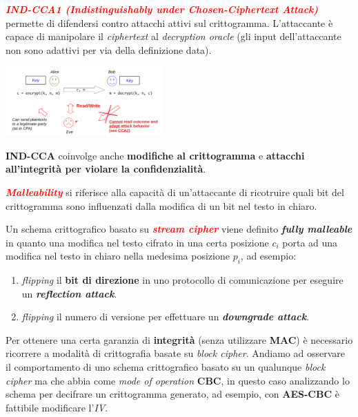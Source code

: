 \begin{flushleft}
    \textcolor{red}{\textbf{\textit{IND-CCA1 (Indistinguishably under Chosen-Ciphertext Attack)}}} permette di difendersi contro attacchi attivi sul crittogramma. L'attaccante è capace di manipolare il \textit{ciphertext} al \textit{decryption oracle} (gli input dell'attaccante non sono adattivi per via della definizione data).

    {\centering
        \includegraphics[width=0.45\textwidth]{img/ind_cca1.png}
    \par}

    \textbf{IND-CCA} coinvolge anche \textbf{modifiche al crittogramma} e \textbf{attacchi all'integrità per violare la confidenzialità}. 

    \smallskip

    \textcolor{red}{\textbf{\textit{Malleability}}} si riferisce alla capacità di un'attaccante di ricotruire quali bit del crittogramma sono influenzati dalla modifica di un bit nel testo in chiaro.

    \smallskip

    Un schema crittografico basato su \textcolor{red}{\textbf{\textit{stream cipher}}} viene definito \textbf{\textit{fully malleable}} in quanto una modifica nel testo cifrato in una certa posizione $c_i$ porta ad una modifica nel testo in chiaro nella medesima posizione $p_i$, ad esempio:
    \begin{enumerate}[nosep]
        \item \textit{flipping} il \textbf{bit di direzione} in uno protocollo di comunicazione per eseguire un \textbf{\textit{reflection attack}}.
        \item \textit{flipping} il numero di versione per effettuare un \textbf{\textit{downgrade attack}}.
    \end{enumerate}

    \smallskip

    Per ottenere una certa garanzia di \textbf{integrità} (senza utilizzare \textbf{MAC}) è necessario ricorrere a modalità di crittografia basate su \textit{block cipher}. Andiamo ad osservare il comportamento di uno schema crittografico basato su un qualunque \textit{block cipher} ma che abbia come \textit{mode of operation} \textbf{CBC}, in questo caso analizzando lo schema per decifrare un crittogramma generato, ad esempio, con \textbf{AES-CBC} è fattibile modificare l'\textit{IV}.


\end{flushleft}
